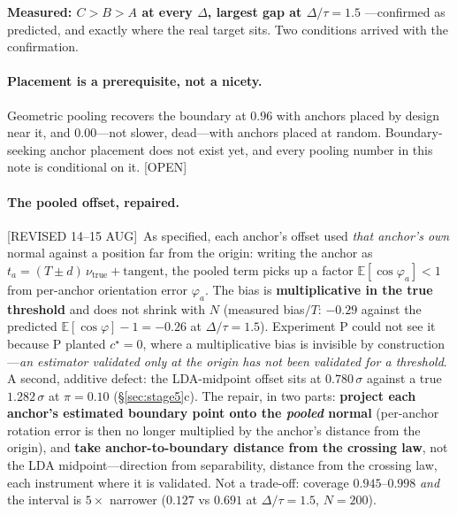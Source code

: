\documentclass[11pt]{article}
\newcommand{\provtag}[2]{{\footnotesize\sffamily\textcolor{#1}{[#2]}}}
\newcommand{\OPENT}{\provtag{openamber}{OPEN}}
\newcommand{\REVI}{\provtag{openamber}{REVISED 14--15 AUG}}
\begin{document}
\noindent \textbf{Measured: $C > B > A$ at every $\Delta$, largest gap at $\Delta/\tau = 1.5$}
---confirmed as predicted, and exactly where the real target sits. Two conditions arrived with
the confirmation.

\paragraph{Placement is a prerequisite, not a nicety.} Geometric pooling recovers the boundary
at $\mathbf{0.96}$ with anchors placed by design near it, and $\mathbf{0.00}$---not slower,
dead---with anchors placed at random. Boundary-seeking anchor placement does not exist yet, and
every pooling number in this note is conditional on it. \OPENT

\paragraph{The pooled offset, repaired.} \REVI\ As specified, each anchor's offset used
\emph{that anchor's own} normal against a position far from the origin: writing the anchor as
$t_a = (T \pm d)\,\nu_{\text{true}} + \text{tangent}$, the pooled term picks up a factor
$\mathbb{E}[\cos\varphi_a] < 1$ from per-anchor orientation error $\varphi_a$. The bias is
\textbf{multiplicative in the true threshold} and does not shrink with $N$ (measured bias$/T$:
$-0.29$ against the predicted $\mathbb{E}[\cos\varphi] - 1 = -0.26$ at $\Delta/\tau = 1.5$).
Experiment P could not see it because P planted $c^\star = 0$, where a multiplicative bias is
invisible by construction---\emph{an estimator validated only at the origin has not been
validated for a threshold}. A second, additive defect: the LDA-midpoint offset sits at
$0.780\,\sigma$ against a true $1.282\,\sigma$ at $\pi = 0.10$ (\S\ref{sec:stage5}c). The
repair, in two parts: \textbf{project each anchor's estimated boundary point onto the
\emph{pooled} normal} (per-anchor rotation error is then no longer multiplied by the anchor's
distance from the origin), and \textbf{take anchor-to-boundary distance from the crossing law},
not the LDA midpoint---direction from separability, distance from the crossing law, each
instrument where it is validated. Not a trade-off: coverage $0.945$--$0.998$ \emph{and} the
interval is $5\times$ narrower ($0.127$ vs $0.691$ at $\Delta/\tau = 1.5$, $N = 200$).
\end{document}
